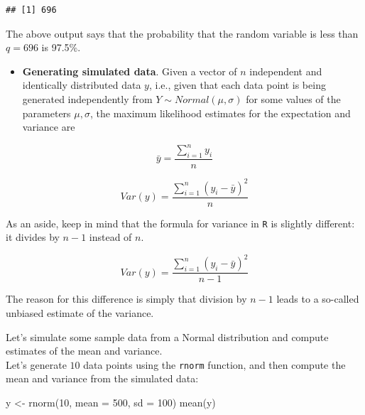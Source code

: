 \documentclass[
  12pt,
]{krantz}
\newenvironment{Shaded}{\begin{snugshade}}{\end{snugshade}}
\newcommand{\AttributeTok}[1]{\textcolor[rgb]{0.77,0.63,0.00}{#1}}
\newcommand{\DecValTok}[1]{\textcolor[rgb]{0.00,0.00,0.81}{#1}}
\newcommand{\FunctionTok}[1]{\textcolor[rgb]{0.00,0.00,0.00}{#1}}
\newcommand{\NormalTok}[1]{#1}
\newcommand{\OtherTok}[1]{\textcolor[rgb]{0.56,0.35,0.01}{#1}}
\providecommand{\tightlist}{%
  \setlength{\itemsep}{0pt}\setlength{\parskip}{0pt}}
\theoremstyle{definition}
\theoremstyle{definition}
\theoremstyle{definition}
\theoremstyle{definition}
\theoremstyle{remark}
\begin{document}
\begin{verbatim}
## [1] 696
\end{verbatim}

The above output says that the probability that the random variable is less than \(q=696\) is 97.5\%.

\begin{itemize}
\tightlist
\item
  \textbf{Generating simulated data}. Given a vector of \(n\) independent and identically distributed data \(y\), i.e., given that each data point is being generated independently from \(Y \sim Normal(\mu,\sigma)\) for some values of the parameters \(\mu,\sigma\), the maximum likelihood estimates for the expectation and variance are
\end{itemize}

\begin{equation}
\bar{y} =  \frac{\sum_{i=1}^n y_i}{n} 
\end{equation}

\begin{equation}
Var(y) = \frac{\sum_{i=1}^n (y_i-
\bar{y})^2}{n}
\end{equation}

As an aside, keep in mind that the formula for variance in \texttt{R} is slightly different: it divides by \(n-1\) instead of \(n\).

\begin{equation}
Var(y) = \frac{\sum_{i=1}^n (y_i-
\bar{y})^2}{n-1}
\end{equation}

The reason for this difference is simply that division by \(n-1\) leads to a so-called unbiased estimate of the variance.

Let's simulate some sample data from a Normal distribution and compute estimates of the mean and variance.\\
Let's generate \(10\) data points using the \texttt{rnorm} function, and then compute the mean and variance from the simulated data:

\begin{Shaded}
\begin{Highlighting}[]
\NormalTok{y }\OtherTok{\textless{}{-}} \FunctionTok{rnorm}\NormalTok{(}\DecValTok{10}\NormalTok{, }\AttributeTok{mean =} \DecValTok{500}\NormalTok{, }\AttributeTok{sd =} \DecValTok{100}\NormalTok{)}
\FunctionTok{mean}\NormalTok{(y)}
\end{Highlighting}
\end{Shaded}
\end{document}
